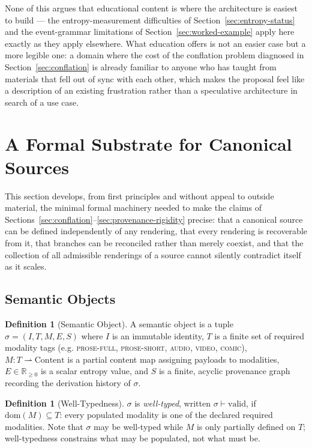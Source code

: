 \documentclass[11pt]{article}
\theoremstyle{definition}
\newtheorem{definition}[theorem]{Definition}
\begin{document}
None of this argues that educational content is where the architecture is easiest to build --- the entropy-measurement difficulties of Section~\ref{sec:entropy-status} and the event-grammar limitations of Section~\ref{sec:worked-example} apply here exactly as they apply elsewhere. What education offers is not an easier case but a more legible one: a domain where the cost of the conflation problem diagnosed in Section~\ref{sec:conflation} is already familiar to anyone who has taught from materials that fell out of sync with each other, which makes the proposal feel like a description of an existing frustration rather than a speculative architecture in search of a use case.

\section{A Formal Substrate for Canonical Sources}
\label{sec:formal-realization}

This section develops, from first principles and without appeal to outside material, the minimal formal machinery needed to make the claims of Sections~\ref{sec:conflation}--\ref{sec:provenance-rigidity} precise: that a canonical source can be defined independently of any rendering, that every rendering is recoverable from it, that branches can be reconciled rather than merely coexist, and that the collection of all admissible renderings of a source cannot silently contradict itself as it scales.

\subsection{Semantic Objects}

\begin{definition}[Semantic Object]
\label{def:semantic-object}
A semantic object is a tuple $\sigma = (I, T, M, E, S)$ where $I$ is an immutable identity, $T$ is a finite set of required modality tags (e.g. \textsc{prose-full}, \textsc{prose-short}, \textsc{audio}, \textsc{video}, \textsc{comic}), $M : T \rightharpoonup \mathrm{Content}$ is a partial content map assigning payloads to modalities, $E \in \mathbb{R}_{\geq 0}$ is a scalar entropy value, and $S$ is a finite, acyclic provenance graph recording the derivation history of $\sigma$.
\end{definition}

\begin{definition}[Well-Typedness]
\label{def:well-typed}
$\sigma$ is \emph{well-typed}, written $\sigma \vdash \mathrm{valid}$, if $\mathrm{dom}(M) \subseteq T$: every populated modality is one of the declared required modalities. Note that $\sigma$ may be well-typed while $M$ is only partially defined on $T$; well-typedness constrains what may be populated, not what must be.
\end{definition}
\end{document}
